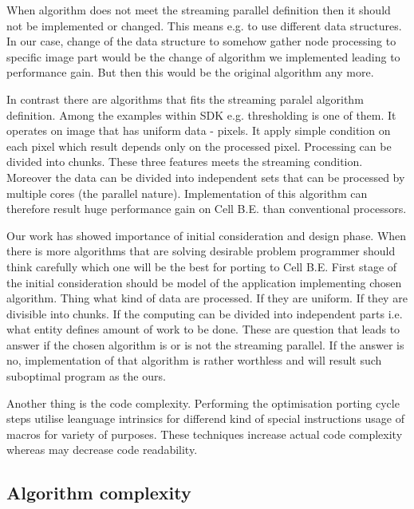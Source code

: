 \par
When algorithm does not meet the streaming parallel definition then it should not be implemented or changed.
This means e.g. to use different data structures.
In our case, change of the data structure to somehow gather node processing to specific image part would be the change of algorithm we implemented leading to performance gain.
But then this would be the original algorithm any more.

\par
In contrast there are algorithms that fits the streaming paralel algorithm definition.
Among the examples within SDK e.g. thresholding is one of them.
It operates on image that has uniform data - pixels.
It apply simple condition on each pixel which result depends only on the processed pixel.
Processing can be divided into chunks.
These three features meets the streaming condition.
Moreover the data can be divided into independent sets that can be processed by multiple cores (the parallel nature).
Implementation of this algorithm can therefore result huge performance gain on Cell B.E. than conventional processors.

\par
Our work has showed importance of initial consideration and design phase.
When there is more algorithms that are solving desirable problem programmer should think carefully which one will be the best for porting to Cell B.E.
First stage of the initial consideration should be model of the application implementing chosen algorithm.
Thing what kind of data are processed.
If they are uniform.
If they are divisible into chunks.
If the computing can be divided into independent parts i.e. what entity defines amount of work to be done.
These are question that leads to answer if the chosen algorithm is or is not the streaming parallel.
If the answer is no, implementation of that algorithm is rather worthless and will result such suboptimal program as the ours.

\par
Another thing is the code complexity.
Performing the optimisation porting cycle steps utilise leanguage intrinsics for differend kind of special instructions usage of macros for variety of purposes.
These techniques increase actual code complexity whereas may decrease code readability.

\subsection{Algorithm complexity}

